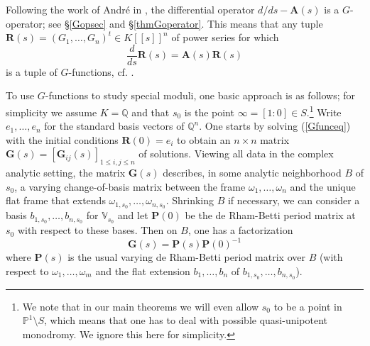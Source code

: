 \documentclass[10pt]{article}
\numberwithin{equation}{section}
\theoremstyle{plain}
\theoremstyle{definition}
\theoremstyle{remark}
\begin{document}
Following the work of Andr\'e in \cite{zbMATH00041964}, the differential operator $d/ds - \mathbf{A}(s)$ is a $G$-operator; see \S\ref{Gopsec} and \S \ref{thmGoperator}. This means that any tuple $\mathbf{R}(s) = (G_{1}, \hdots, G_{n})^{t} \in K[[s]]^{n}$ of power series for which
\begin{equation}
\label{Gfunceq}
\frac{d}{ds} \mathbf{R}(s) = \mathbf{A}(s) \mathbf{R}(s)
\end{equation}
is a tuple of $G$-functions, cf. .

\medskip

To use $G$-functions to study special moduli, one basic approach is as follows; for simplicity we assume $K = \mathbb{Q}$ and that $s_{0}$ is the point $\infty = [1 : 0] \in S$.\footnote{We note that in our main theorems we will even allow $s_0$ to be a point in $\mathbb{P}^1 \setminus S$, which means that one has to deal with possible quasi-unipotent monodromy. We ignore this here for simplicity.} Write $e_{1}, \hdots, e_{n}$ for the standard basis vectors of $\mathbb{Q}^{n}$. One starts by solving (\ref{Gfunceq}) with the initial conditions $\mathbf{R}(0) = e_{i}$ to obtain an $n \times n$ matrix $\mathbf{G}(s) = [\mathbf{G}_{ij}(s)]_{1 \leq i, j \leq n}$ of solutions. Viewing all data in the complex analytic setting, the matrix $\mathbf{G}(s)$ describes, in some analytic neighborhood $B$ of $s_{0}$, a varying change-of-basis matrix between the frame $\omega_{1}, \hdots, \omega_{n}$ and the unique flat frame that extends $\omega_{1,s_{0}}, \hdots, \omega_{n, s_{0}}$. Shrinking $B$ if necessary, we can consider a basis $b_{1,s_{0}}, \hdots, b_{n,s_{0}}$ for $\mathbb{V}_{s_{0}}$ and let $\mathbf{P}(0)$ be the de Rham-Betti period matrix at $s_{0}$ with respect to these bases. Then on $B$, one has a factorization
\begin{equation}
\label{Gfaceq}
\mathbf{G}(s) = \mathbf{P}(s) \mathbf{P}(0)^{-1} 
\end{equation}
where $\mathbf{P}(s)$ is the usual varying de Rham-Betti period matrix over $B$ (with respect to $\omega_{1}, \hdots, \omega_{m}$ and the flat extension $b_{1}, \hdots, b_{n}$ of $b_{1,s_{0}}, \hdots, b_{n,s_{0}}$). 
\end{document}
